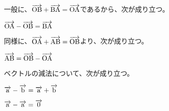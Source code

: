 \documentclass[pulatex,dvpdfmx,a4paper]{jsarticle}
\newcommand{\bekutoru}[1]{\overrightarrow{\rm #1}}
\begin{document}
一般に、$\bekutoru{OB}+\bekutoru{BA}=\bekutoru{OA}$であるから、次が成り立つ。
\begin{screen}
  $\bekutoru{OA}-\bekutoru{OB}=\bekutoru{BA}$
\end{screen}

同様に、$\bekutoru{OA}+\bekutoru{AB}=\bekutoru{OB}$より、次が成り立つ。\par
\begin{screen}
  $\bekutoru{AB}=\bekutoru{OB}-\bekutoru{OA}$
\end{screen}

ベクトルの減法について、次が成り立つ。
\begin{screen}
  $\bekutoru{a}-\bekutoru{b}=\bekutoru{a}+\bekutoru{b}$\par
  $\bekutoru{a}-\bekutoru{a}=\bekutoru{0}$
\end{screen}
\end{document}
